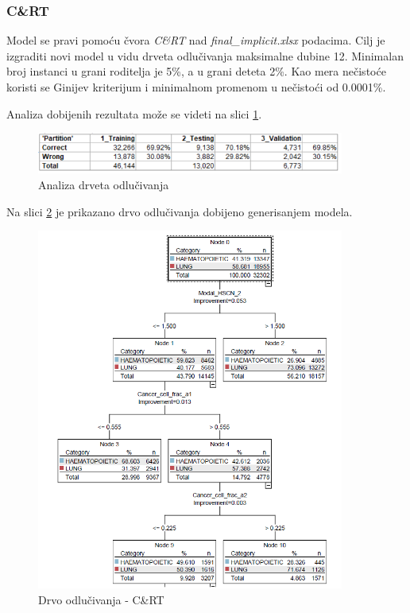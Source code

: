 \documentclass[a4paper]{article}
\begin{document}
\subsubsection{C\&RT}
\label{subsubsec:CRT}

Model se pravi pomoću čvora \textit{C\&RT} nad \textit{final\_implicit.xlsx} podacima. Cilj je izgraditi novi model u vidu drveta odlučivanja maksimalne dubine 12. Minimalan broj instanci u grani roditelja je 5\%, a u grani deteta 2\%. Kao mera nečistoće koristi se Ginijev kriterijum i minimalnom promenom u nečistoći od 0.0001\%.

Analiza dobijenih rezultata može se videti na slici \ref{fig:crt_analysis}.

        \begin{figure}[ht!]
                \centering
                \includegraphics[width=0.9\textwidth]{CRT_analysis.PNG}
                \caption{Analiza drveta odlučivanja}
                \label{fig:crt_analysis}
            \end{figure}
            
Na slici \ref{fig:crt_tree} je prikazano drvo odlučivanja dobijeno generisanjem modela.
\begin{figure}[ht!]
                \centering
                \includegraphics[width=0.9\textwidth]{CRT_model.PNG}
                \caption{Drvo odlučivanja - C\&RT}
                \label{fig:crt_tree}
            \end{figure}
\end{document}
